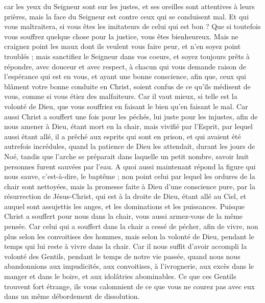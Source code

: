 \begin{multicols}{2}
car les yeux du Seigneur sont sur les justes, et ses oreilles sont attentives à leurs prières, mais la face du Seigneur est contre ceux qui se conduisent mal.
Et qui vous maltraitera, si vous êtes les imitateurs de celui qui est bon ?
Que si toutefois vous souffrez quelque chose pour la justice, vous êtes bienheureux. Mais ne craignez point les maux dont ils veulent vous faire peur, et n'en soyez point troublés ;
mais sanctifiez le Seigneur dans vos coeurs, et soyez toujours prêts à répondre, avec douceur et avec respect, à chacun qui vous demande raison de l'espérance qui est en vous, 
et ayant une bonne conscience, afin que, ceux qui blâment votre bonne conduite en Christ, soient confus de ce qu'ils médisent de vous, comme si vous étiez des malfaiteurs.
Car il vaut mieux, si telle est la volonté de Dieu, que vous souffriez en faisant le bien qu’en faisant le mal.
Car aussi Christ a souffert une fois pour les péchés, lui juste pour les injustes, afin de nous amener à Dieu, étant mort en la chair, mais vivifié par l'Esprit,
par lequel aussi étant allé, il a  prêché aux esprits qui sont en prison,
et qui avaient été autrefois incrédules, quand la patience de Dieu les attendait, durant les jours de Noé, tandis que l'arche se préparait dans laquelle un petit nombre, savoir huit personnes furent sauvées par l'eau.
A quoi aussi maintenant répond la figure qui nous sauve, c'est-à-dire, le baptême ; non point celui par lequel les ordures de la chair sont nettoyées, mais la promesse faite à Dieu d'une conscience pure, par la résurrection de Jésus-Christ,
qui est à la droite de Dieu, étant allé au Ciel, et auquel sont assujettis les anges, et les dominations et les puissances.
\VerseOne{}Puisque Christ a souffert pour nous dans la chair, vous aussi armez-vous de la même pensée. Car celui qui a souffert dans la chair a cessé de pécher,
afin de vivre, non plus selon les convoitises des hommes, mais selon la volonté de Dieu, pendant le temps qui lui reste à vivre dans la chair.
Car il nous suffit d'avoir accompli la volonté des Gentils, pendant le temps de notre vie passée, quand nous nous abandonnions aux impudicités, aux convoitises, à l'ivrognerie, aux excès dans le manger et dans le boire, et aux idolâtries abominables.
Ce que ces Gentils trouvent fort étrange, ils vous calomnient de ce que vous ne courez pas avec eux dans un même débordement de dissolution. 

\end{multicols}
